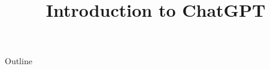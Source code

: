 \documentclass[xcolor=dvipsnames,compress,t,pdf,9pt]{beamer}
\title[\insertframenumber /\inserttotalframenumber]{Introduction to ChatGPT}
\begin{document}
	\begin{frame}
	\titlepage
	\end{frame}
	
	\begin{frame}{Outline}
	    \tableofcontents
	\end{frame}

	
	
	
	
	
	
	
\end{document}
